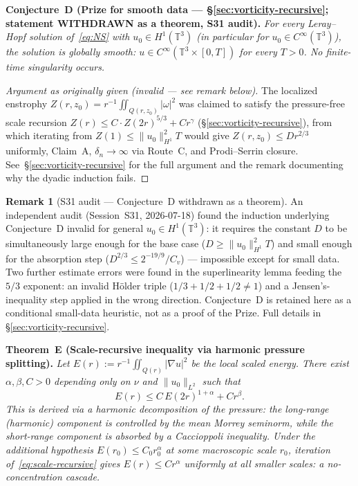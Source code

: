 \documentclass[11pt]{article}
\theoremstyle{definition}
\newtheorem{remark}[theorem]{Remark}
\theoremstyle{remark}
\newcommand{\T}{\mathbb{T}}
\newcommand{\grad}{\nabla}
\begin{document}
\medskip
\noindent\textbf{Conjecture~D (Prize for smooth data --- §\ref{sec:vorticity-recursive};
statement WITHDRAWN as a theorem, S31 audit).}
\emph{For every Leray--Hopf solution of~\eqref{eq:NS} with $u_0\in H^1(\T^3)$
(in particular for $u_0\in C^\infty(\T^3)$), the solution is globally smooth:
$u\in C^\infty(\T^3\times[0,T])$ for every $T>0$.  No finite-time singularity
occurs.}
\begin{proof}[Argument as originally given (invalid — see remark below)]
The localized enstrophy $Z(r,z_0)=r^{-1}\iint_{Q(r,z_0)}|\omega|^2$ was claimed to
satisfy the pressure-free scale recursion $Z(r)\leq C\cdot Z(2r)^{5/3}+Cr^\gamma$
(§\ref{sec:vorticity-recursive}), from which iterating from $Z(1)\leq\|u_0\|_{H^1}^2 T$
would give $Z(r,z_0)\leq Dr^{2/3}$ uniformly, Claim~A, $\delta_n\to\infty$ via
Route~C, and Prodi--Serrin closure.  See~§\ref{sec:vorticity-recursive} for the
full argument and the remark documenting why the dyadic induction fails.
\end{proof}

\begin{remark}[S31 audit --- Conjecture~D withdrawn as a theorem]
An independent audit (Session~S31, 2026-07-18) found the induction underlying
Conjecture~D invalid for general $u_0\in H^1(\T^3)$: it requires the constant $D$
to be simultaneously large enough for the base case ($D\geq\|u_0\|_{H^1}^2T$) and
small enough for the absorption step ($D^{2/3}\leq 2^{-19/9}/C_v$) --- impossible
except for small data.  Two further estimate errors were found in the
superlinearity lemma feeding the $5/3$ exponent: an invalid H\"older triple
($1/3+1/2+1/2\neq1$) and a Jensen's-inequality step applied in the wrong
direction.  Conjecture~D is retained here as a conditional small-data heuristic,
not as a proof of the Prize.  Full details in §\ref{sec:vorticity-recursive}.
\end{remark}

\medskip
\noindent\textbf{Theorem~E (Scale-recursive inequality via harmonic pressure splitting).}
\emph{Let $E(r) := r^{-1}\iint_{Q(r)}|\grad u|^2$ be the local scaled
energy.  There exist $\alpha,\beta,C > 0$ depending only on $\nu$ and
$\|u_0\|_{L^2}$ such that
\begin{equation}\label{eq:scale-recursive}
  E(r) \leq C\,E(2r)^{1+\alpha} + Cr^\beta.
\end{equation}
This is derived via a harmonic decomposition of the pressure: the long-range
(harmonic) component is controlled by the mean Morrey seminorm, while the
short-range component is absorbed by a Caccioppoli inequality.  Under the
additional hypothesis $E(r_0)\leq C_0 r_0^\alpha$ at some macroscopic scale
$r_0$, iteration of~\eqref{eq:scale-recursive} gives $E(r)\leq Cr^\alpha$
uniformly at all smaller scales: a \emph{no-concentration cascade}.}
\end{document}

